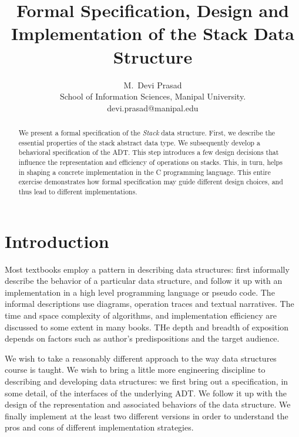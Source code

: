 \documentclass[10pt]{article}
\begin{document}
\title{Formal Specification, Design and Implementation of the Stack Data Structure}
\author{
  M.\, Devi Prasad\\
  School of Information Sciences, Manipal University.\vspace*{6pt}\\
  devi.prasad@manipal.edu
 }
\date{}
\maketitle

\begin{abstract}
We present a formal specification of the \emph{Stack} data structure. First, we describe the essential properties of the stack abstract data type. We subsequently develop a behavioral specification of the ADT. This step introduces a few design decisions that influence the representation and efficiency of operations on stacks. This, in turn, helps in shaping a concrete implementation in the C programming language. This entire exercise demonstrates how formal specification may guide different design choices, and thus lead to different implementations.
\end{abstract}

\section{Introduction}
Most textbooks employ a pattern in describing data structures: first informally describe the behavior of a particular data structure, and follow it up with an implementation in a high level programming language or pseudo code. The informal descriptions use diagrams, operation traces and textual narratives. The time and space complexity of algorithms, and implementation efficiency are discussed to some extent in many books. THe depth and breadth of exposition depends on factors such as author's predispositions and the target audience.

We wish to take a reasonably different approach to the way data structures course is taught. We wish to bring a little more engineering discipline to describing and developing data structures: we first bring out a specification, in some detail, of the interfaces of the underlying ADT. We follow it up with the design of the representation and associated behaviors of the data structure. We finally implement at the least two different versions in order to understand the pros and cons of different implementation strategies.
\end{document}
